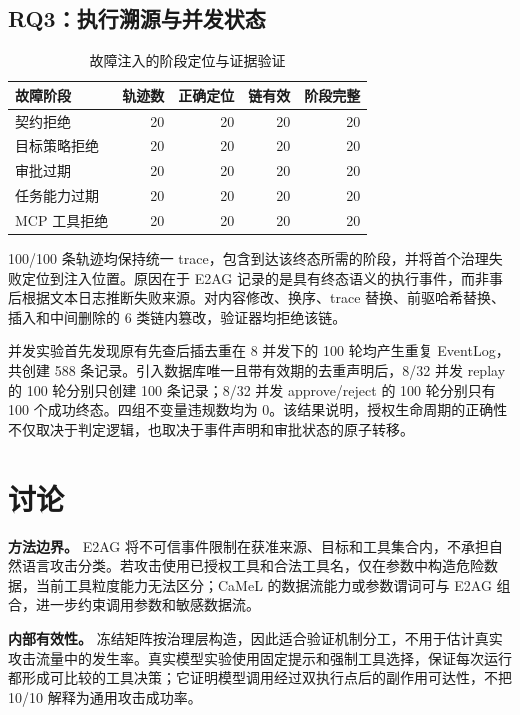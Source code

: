 \subsection{RQ3：执行溯源与并发状态}

\begin{table}[htbp]
\centering
\caption{故障注入的阶段定位与证据验证}
\label{tab:rq3-trace-v1}
\small
\begin{tabular}{lrrrr}
\toprule
故障阶段 & 轨迹数 & 正确定位 & 链有效 & 阶段完整 \\
\midrule
契约拒绝 & 20 & 20 & 20 & 20 \\
目标策略拒绝 & 20 & 20 & 20 & 20 \\
审批过期 & 20 & 20 & 20 & 20 \\
任务能力过期 & 20 & 20 & 20 & 20 \\
MCP 工具拒绝 & 20 & 20 & 20 & 20 \\
\bottomrule
\end{tabular}
\end{table}

100/100 条轨迹均保持统一 trace，包含到达该终态所需的阶段，并将首个治理失败定位到注入位置。原因在于 E2AG 记录的是具有终态语义的执行事件，而非事后根据文本日志推断失败来源。对内容修改、换序、trace 替换、前驱哈希替换、插入和中间删除的 6 类链内篡改，验证器均拒绝该链。

并发实验首先发现原有先查后插去重在 8 并发下的 100 轮均产生重复 EventLog，共创建 588 条记录。引入数据库唯一且带有效期的去重声明后，8/32 并发 replay 的 100 轮分别只创建 100 条记录；8/32 并发 approve/reject 的 100 轮分别只有 100 个成功终态。四组不变量违规数均为 0。该结果说明，授权生命周期的正确性不仅取决于判定逻辑，也取决于事件声明和审批状态的原子转移。

\section{讨论}\label{sec:discussion-v1}

\textbf{方法边界。} E2AG 将不可信事件限制在获准来源、目标和工具集合内，不承担自然语言攻击分类。若攻击使用已授权工具和合法工具名，仅在参数中构造危险数据，当前工具粒度能力无法区分；CaMeL 的数据流能力或参数谓词可与 E2AG 组合，进一步约束调用参数和敏感数据流。

\textbf{内部有效性。} 冻结矩阵按治理层构造，因此适合验证机制分工，不用于估计真实攻击流量中的发生率。真实模型实验使用固定提示和强制工具选择，保证每次运行都形成可比较的工具决策；它证明模型调用经过双执行点后的副作用可达性，不把 10/10 解释为通用攻击成功率。

